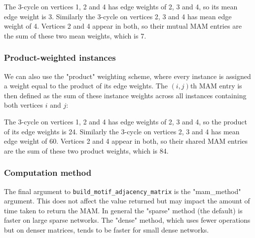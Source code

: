 \documentclass{article}
\begin{document}
\begin{pyconsole}
\end{pyconsole}

The 3-cycle on vertices 1, 2 and 4
has edge weights of 2, 3 and 4, so its mean edge weight is 3.
Similarly the 3-cycle on vertices 2, 3 and 4 has mean edge weight of 4.
Vertices 2 and 4 appear in both, so their mutual MAM entries are the
sum of these two mean weights, which is 7.

\subsubsection{Product-weighted instances}

We can also use the "product" weighting scheme,
where every instance is assigned a weight equal to the
product of its edge weights.
The $(i,j)$th MAM entry is then defined as the sum of these
instance weights across all instances containing
both vertices $i$ and $j$:

\pagebreak

\begin{pyconsole}
\end{pyconsole}

The 3-cycle on vertices 1, 2 and 4
has edge weights of 2, 3 and 4, so the product of its edge weights is 24.
Similarly the 3-cycle on vertices 2, 3 and 4 has mean edge weight of 60.
Vertices 2 and 4 appear in both, so their shared MAM entries are the
sum of these two product weights, which is 84.

\subsubsection{Computation method}

The final argument to \texttt{build\_motif\_adjacency\_matrix}
is the "mam\_method" argument.
This does not affect the value returned but may impact the
amount of time taken to return the MAM.
In general the "sparse" method (the default)
is faster on large sparse networks.
The "dense" method, which uses fewer operations but on
denser matrices, tends to be faster for small dense networks.


\begin{pyconsole}
\end{pyconsole}
\end{document}
